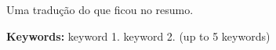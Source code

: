 Uma tradução do que ficou no resumo.

\vspace*{.05\textheight}

\noindent \textbf{Keywords:} keyword 1. keyword 2. (up to 5 keywords)
